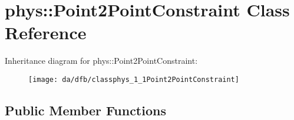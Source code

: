\hypertarget{classphys_1_1Point2PointConstraint}{
\section{phys::Point2PointConstraint Class Reference}
\label{da/dfb/classphys_1_1Point2PointConstraint}
}
Inheritance diagram for phys::Point2PointConstraint:\begin{figure}[H]
\begin{center}
\leavevmode
\texttt{[image: da/dfb/classphys\_1\_1Point2PointConstraint]}
\end{center}
\end{figure}
\subsection*{Public Member Functions}
